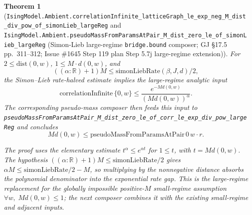 \documentclass[a4paper,11pt]{article}
\newtheorem{theorem}{Theorem}
\begin{document}
\begin{theorem}[\texttt{IsingModel.Ambient.correlationInfinite\_latticeGraph\_le\_exp\_neg\_M\_dist\_div\_pow\_of\_simonLieb\_largeReg}
and
\texttt{IsingModel.Ambient.pseudoMassFromParamsAtPair\_M\_dist\_zero\_le\_of\_simonLieb\_largeReg}
(Simon-Lieb large-regime \texttt{bridge.bound} composer;
GJ \S17.5 pp.~311--312; Issue \#1645 Step 119 plan Step 5.7j large-regime
extension)]
For $2 \le \mathrm{dist}(0,w)$, $1 \le M\cdot d(0,w)$, and
\[
  ((\alpha:\mathbb{R})+1)M \le \mathrm{simonLiebRate}(\beta,J,d)/2,
\]
the Simon--Lieb rate-halved estimate implies the large-regime analytic input
\[
  \mathrm{correlationInfinite}\,\{0,w\}
    \le
    \frac{e^{-M d(0,w)}}{(M d(0,w))^\alpha}.
\]
The corresponding pseudo-mass composer then feeds this input to
\texttt{pseudoMassFromParamsAtPair\_M\_dist\_zero\_le\_of\_corr\_le\_exp\_div\_pow\_largeReg}
and concludes
\[
  M d(0,w)
    \le
    \mathrm{pseudoMassFromParamsAtPair}\,0\,w \cdot r.
\]

The proof uses the elementary estimate $t^\alpha \le e^{\alpha t}$ for
$1 \le t$, with $t=M d(0,w)$.  The hypothesis
$((\alpha:\mathbb{R})+1)M \le \mathrm{simonLiebRate}/2$ gives
$\alpha M \le \mathrm{simonLiebRate}/2 - M$, so multiplying by the
nonnegative distance absorbs the polynomial denominator into the exponential
rate gap.  This is the large-regime replacement for the globally impossible
positive-$M$ small-regime assumption
$\forall w,\; M d(0,w) \le 1$; the next composer combines it with the existing
small-regime and adjacent inputs.
\end{theorem}
\end{document}
